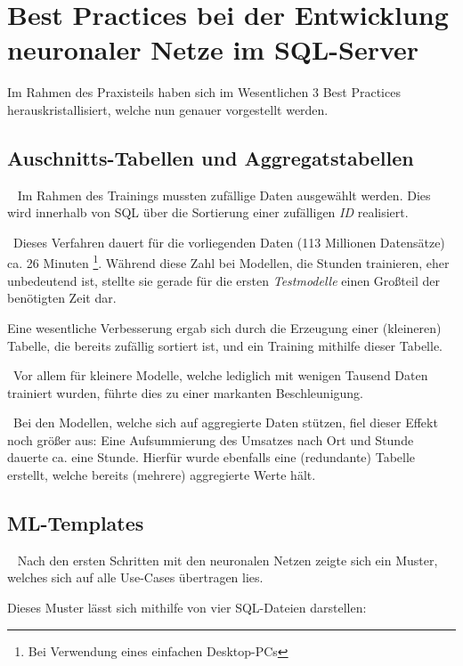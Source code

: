 \section[Best Practices]{Best Practices bei der Entwicklung neuronaler Netze im SQL-Server}
\label{sec:BestPractices}
Im Rahmen des Praxisteils haben sich im Wesentlichen 3 Best Practices herauskristallisiert, welche nun genauer vorgestellt werden. 

\subsection{Auschnitts-Tabellen und Aggregatstabellen} ~\newline
Im Rahmen des Trainings mussten zufällige Daten ausgewählt werden. Dies wird innerhalb von SQL über die Sortierung einer zufälligen \textit{ID} realisiert. 

~\newline Dieses Verfahren dauert für die vorliegenden Daten (113 Millionen Datensätze) ca. 26 Minuten \footnote{Bei Verwendung eines einfachen Desktop-PCs}. Während diese Zahl bei Modellen, die Stunden trainieren, eher unbedeutend ist, stellte sie gerade für die ersten \textit{Testmodelle} einen Großteil der benötigten Zeit dar. 

Eine wesentliche Verbesserung ergab sich durch die Erzeugung einer (kleineren) Tabelle, die bereits zufällig sortiert ist, und ein Training mithilfe dieser Tabelle. 

~\newline Vor allem für kleinere Modelle, welche lediglich mit wenigen Tausend Daten trainiert wurden, führte dies zu einer markanten Beschleunigung.

~\newline Bei den Modellen, welche sich auf aggregierte Daten stützen, fiel dieser Effekt noch größer aus: Eine Aufsummierung des Umsatzes nach Ort und Stunde dauerte ca. eine Stunde. Hierfür wurde ebenfalls eine (redundante) Tabelle erstellt, welche bereits (mehrere) aggregierte Werte hält. 
\newpage
\subsection{ML-Templates} ~\newline
Nach den ersten Schritten mit den neuronalen Netzen zeigte sich ein Muster, welches sich auf alle Use-Cases übertragen lies. 

Dieses Muster lässt sich mithilfe von vier SQL-Dateien darstellen:


